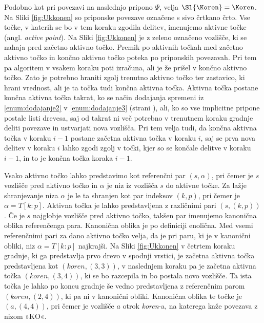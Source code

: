 Podobno kot pri povezavi na naslednjo pripono $\Psi$, velja $\Sl{\Koren}=\Koren$. Na Sliki \ref{fig:Ukkonen} so priponske povezave označene s sivo črtkano črto. Vse točke, v katerih se bo v tem koraku zgodila delitev, imenujemo aktivne točke (angl. \textit{active point}).  Na Sliki \ref{fig:Ukkonen} je z zeleno označeno vozlišče, ki se nahaja pred začetno aktivno točko. Premik po aktivnih točkah med začetno aktivno točko in končno aktivno točko poteka po priponskih povezavah. Pri tem pa algoritem v vsakem koraku poti izračuna, ali je že prišel v končno aktivno točko. Zato je potrebno hraniti zgolj trenutno aktivno točko ter zastavico, ki hrani vrednost, ali je ta točka tudi končna aktivna točka. Aktivna točka postane končna aktivna točka takrat, ko se način dodajanja spremeni iz \ref{enum:dodajanje2} v \ref{enum:dodajanje3} (strani \pageref{par:naciniDodajanja}), ali, ko so vse implicitne pripone postale listi drevesa, saj od takrat ni več potrebno v trenutnem koraku gradnje deliti povezave in ustvarjati nova vozlišča. Pri tem velja tudi, da končna aktivna točka v koraku $i-1$ postane začetna aktivna točka v koraku $i$, saj se prva nova delitev v koraku $i$ lahko zgodi zgolj v točki, kjer so se končale delitve v koraku $i-1$, in to je končna točka koraka $i-1$. 

Vsako aktivno točko lahko predstavimo kot referenčni par $(s,\alpha)$, pri čemer je $s$ vozlišče pred aktivno točko in $\alpha$ je niz iz vozlišča $s$ do aktivne točke. Za lažje shranjevanje niza $\alpha$ je le ta shranjen kot par indeksov $(k,p)$, pri čemer je $\alpha=T[k:p]$. Aktivna točka je lahko predstavljena z različnimi pari $(s, (k,p))$. Če je $s$  najglobje vozlišče pred aktivno točko, takšen par imenujemo kanonična oblika referenčenga para. Kanonična oblika je po definiciji enolična. Med vsemi referenčnimi pari za dano aktivno točko velja, da je pri paru, ki je v kanonični obliki, niz $\alpha=T[k:p]$ najkrajši. Na Sliki \ref{fig:Ukkonen} v četrtem koraku gradnje, ki ga predstavlja prvo drevo v spodnji vrstici, je začetna aktivna točka predstavljena kot $(\textit{koren},(3,3))$, v naslednjem koraku pa je začetna aktivna točka $(\textit{koren},(3,4))$, ki se bo razcepila in bo postala novo vozlišče. Ta ista točka je lahko po koncu gradnje še vedno predstavljena z referenčnim parom $(\textit{koren},(2,4))$, ki pa ni v kanonični obliki. Kanonična oblika te točke je $(a,(4,4))$, pri čemer je vozlišče $a$ otrok \textit{koren}-a, na katerega kaže povezava z nizom »KO«.

